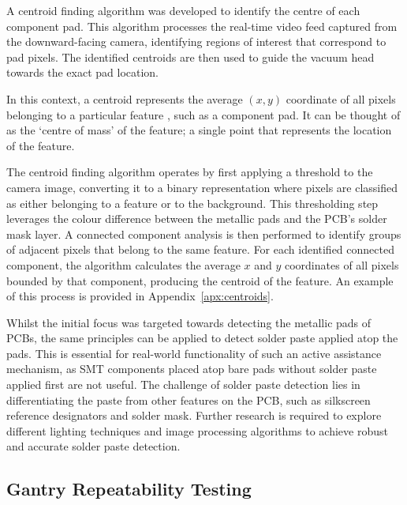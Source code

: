 \documentclass[12pt,british,UKenglish]{article}
\begin{document}
A centroid finding algorithm was developed to identify the centre of each component pad.
This algorithm processes the real-time video feed captured from the downward-facing camera, identifying regions of interest that correspond to pad pixels.
The identified centroids are then used to guide the vacuum head towards the exact pad location.

In this context, a centroid represents the average $(x, y)$ coordinate of all pixels belonging to a particular feature \cite{10.1117/12.58623}, such as a component pad.
It can be thought of as the `centre of mass' of the feature; a single point that represents the location of the feature.

The centroid finding algorithm operates by first applying a threshold to the camera image, converting it to a binary representation where pixels are classified as either belonging to a feature or to the background.
This thresholding step leverages the colour difference between the metallic pads and the \ac{PCB}'s solder mask layer.
A connected component analysis \cite{edImageAnalysis} is then performed to identify groups of adjacent pixels that belong to the same feature.
For each identified connected component, the algorithm calculates the average $x$ and $y$ coordinates of all pixels bounded by that component, producing the centroid of the feature.
An example of this process is provided in Appendix~\ref{apx:centroids}.

Whilst the initial focus was targeted towards detecting the metallic pads of \acp{PCB}, the same principles can be applied to detect solder paste applied atop the pads.
This is essential for real-world functionality of such an active assistance mechanism, as \ac{SMT} components placed atop bare pads without solder paste applied first are not useful.
The challenge of solder paste detection lies in differentiating the paste from other features on the \ac{PCB}, such as silkscreen reference designators and solder mask.
Further research is required to explore different lighting techniques and image processing algorithms to achieve robust and accurate solder paste detection.


\subsection{Gantry Repeatability Testing}\label{sec:Repeatability}
\end{document}
